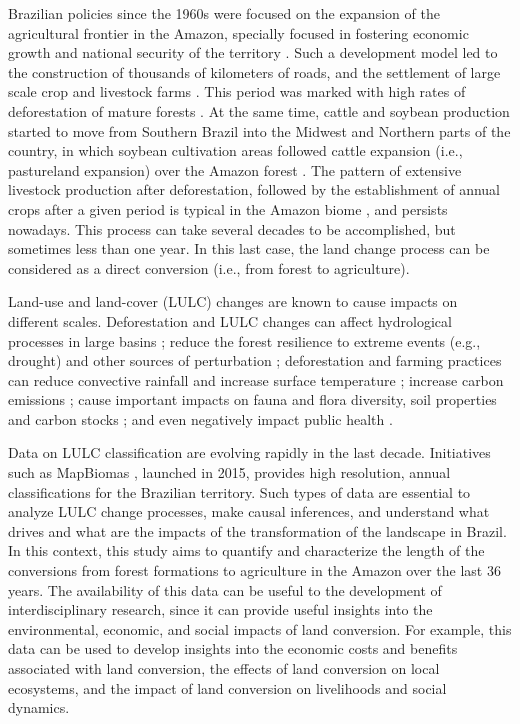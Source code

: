 \documentclass[essd, manuscript]{copernicus}
\begin{document}


\introduction[Introduction]

Brazilian policies since the 1960s were focused on the expansion of the agricultural frontier in the Amazon, specially focused in fostering economic growth and national security of the territory \citep{Carvalho2002, Mcdonald2003, Banerjee2009}. Such a development model led to the construction of thousands of kilometers of roads, and the settlement of large scale crop and livestock farms \citep{Carvalho2002, Banerjee2009}. This period was marked with high rates of deforestation of mature forests \citep{Fearnside2005}. At the same time, cattle and soybean production started to move from Southern Brazil into the Midwest and Northern parts of the country, in which soybean cultivation areas followed cattle expansion (i.e., pastureland expansion) over the Amazon forest \citep{Simon2005, Barona2010, Arima2011}.
The pattern of extensive livestock production after deforestation, followed by the establishment of annual crops after a given period is typical in the Amazon biome \citep{Barona2010}, and persists nowadays.
This process can take several decades to be accomplished, but sometimes less than one year.
In this last case, the land change process can be considered as a direct conversion \citep{Morton2006} (i.e., from forest to agriculture).

Land-use and land-cover (LULC) changes are known to cause impacts on different scales.
Deforestation and LULC changes can affect hydrological processes in large basins \citep{Arias2018}; reduce the forest resilience to extreme events (e.g., drought) and other sources of perturbation \citep{Boulton2022}; deforestation and farming practices can reduce convective rainfall and increase surface temperature \citep{Maeda2021}; increase carbon emissions \citep{Gatti2021}; cause important impacts on fauna and flora diversity, soil properties and carbon stocks \citep{Nunes2022, Rittl2017}; and even negatively impact public health \citep{Ellwanger2020}.

Data on LULC classification are evolving rapidly in the last decade.
Initiatives such as MapBiomas \citep{Souza2020}, launched in 2015, provides high resolution, annual classifications for the Brazilian territory.
Such types of data are essential to analyze LULC change processes, make causal inferences, and understand what drives and what are the impacts of the transformation of the landscape in Brazil.
In this context, this study aims to quantify and characterize the length of the conversions from forest formations to agriculture in the Amazon over the last 36 years.
The availability of this data can be useful to the development of interdisciplinary research, since it can provide useful insights into the environmental, economic, and social impacts of land conversion.
For example, this data can be used to develop insights into the economic costs and benefits associated with land conversion, the effects of land conversion on local ecosystems, and the impact of land conversion on livelihoods and social dynamics.
\end{document}
